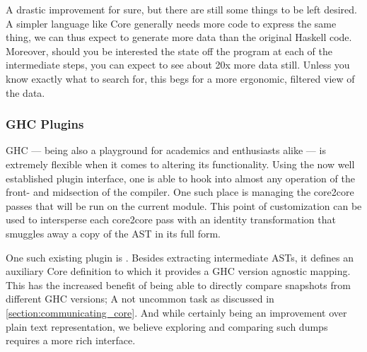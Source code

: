 A drastic improvement for sure, but there are still some things to be left desired.
A simpler language like Core generally needs more code to express the same thing, we can thus expect
to generate more data than the original Haskell code. Moreover, should you be interested the state off
the program at each of the intermediate steps, you can expect to see about 20x more data still.
Unless you know exactly what to search for, this begs for a more ergonomic, filtered view of the data.

\subsubsection{GHC Plugins}

GHC --- being also a playground for academics and enthusiasts alike --- is extremely flexible when it comes to
altering its functionality. Using the now well established plugin interface, one is able to hook into almost
any operation of the front- and midsection of the compiler. One such place is managing the core2core passes that
will be run on the current module. This point of customization can be used to intersperse each core2core pass with an
identity transformation that smuggles away a copy of the AST in its full form.

One such existing plugin is  \cite{ghc_dump}. Besides extracting intermediate ASTs, it defines an
auxiliary Core definition to which it provides a GHC version agnostic mapping. This has the increased benefit of 
being able to directly compare snapshots from different GHC versions; A not uncommon task as discussed in \cref{section:communicating_core}.
And while certainly being an improvement over plain text representation, we believe exploring and comparing such
dumps requires a more rich interface.
